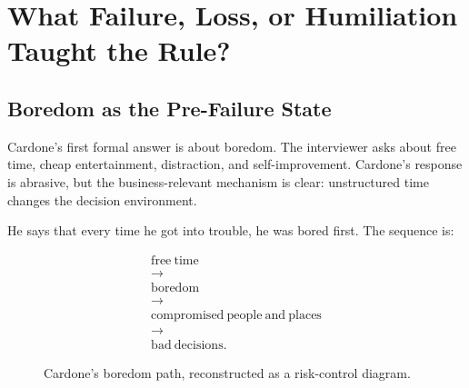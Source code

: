 \documentclass[11pt,oneside]{book}
\begin{document}
\chapter{What Failure, Loss, or Humiliation Taught the Rule?}

\section{Boredom as the Pre-Failure State}

Cardone's first formal answer is about boredom. The interviewer asks about free time, cheap entertainment, distraction, and self-improvement. Cardone's response is abrasive, but the business-relevant mechanism is clear: unstructured time changes the decision environment.

He says that every time he got into trouble, he was bored first. The sequence is:

\begin{equation}
\begin{gathered}
\mathrm{free\ time}\\
\longrightarrow\\
\mathrm{boredom}\\
\longrightarrow\\
\mathrm{compromised\ people\ and\ places}\\
\longrightarrow\\
\mathrm{bad\ decisions}.
\end{gathered}
\end{equation}

\begin{figure}
\centering
{}
\caption{Cardone's boredom path, reconstructed as a risk-control diagram.}
\end{figure}
\end{document}
